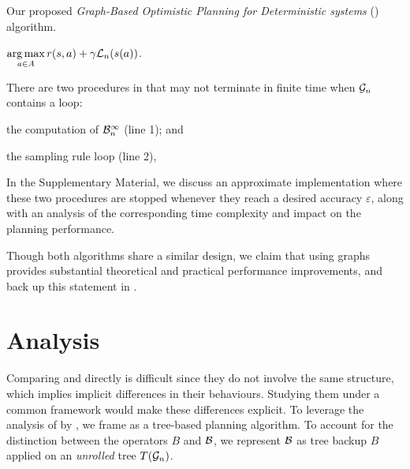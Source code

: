 \documentclass[runningheads]{llncs}
\begin{document}
\begin{algorithm}[th]
	\caption{Our proposed \emph{Graph-Based Optimistic Planning for Deterministic systems} (\GBOPD) algorithm.}
	\label{alg:gbop-d}
	\DontPrintSemicolon
	\Return $\displaystyle\operatorname*{arg\,max}_{a\in A} r(s,a) + \gamma \mathcal{L}_n(s(a))$. 
\end{algorithm}

\begin{remark}
There are two procedures in \GBOPD that may not terminate in finite time when $\mathcal{G}_n$ contains a loop:
\begin{enumerate*}[label=(\roman*)]
	\item the computation of $\mathcal{B}_n^\infty$ (line 1); and
	\item the sampling rule loop (line 2),
\end{enumerate*}
In the Supplementary Material, we discuss an approximate implementation where these two procedures are stopped whenever they reach a desired accuracy $\varepsilon$, along with an analysis of the corresponding time complexity and impact on the planning performance.
\end{remark}

Though both algorithms share a similar design, we claim that using graphs provides substantial theoretical and practical performance improvements, and back up this statement in .

\section{Analysis}
\label{sec:analysis}

Comparing \OPD and \GBOPD directly is difficult since they do not involve the same structure, which implies implicit differences in their behaviours. Studying them under a common framework would make these differences explicit. To leverage the analysis of \OPD by \citet{Hren2008optimistic}, we frame \GBOPD as a tree-based planning algorithm. To account for the distinction between the operators $B$ and $\mathcal{B}$, we represent $\mathcal{B}$ as tree backup $B$ applied on an \emph{unrolled} tree $T(\mathcal{G}_n)$.
\end{document}
